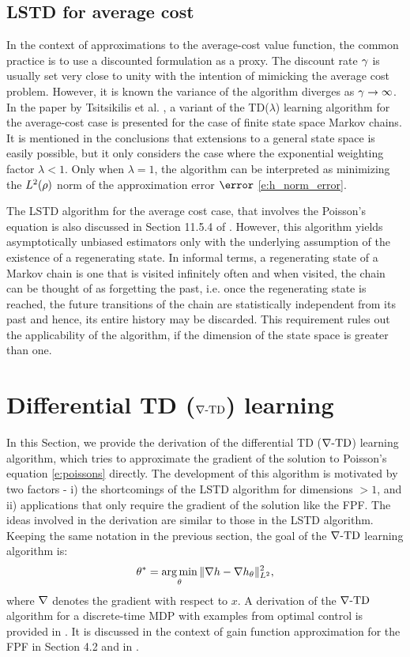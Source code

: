 \subsection{LSTD for average cost}
\label{s:lstd_avg_cost}
In the context of approximations to the average-cost value function, the common practice is to use a discounted formulation as a proxy. The discount rate $\gamma$ is usually set very close to unity with the intention of mimicking the average cost problem. However, it is known the variance of the algorithm diverges as $\gamma \to \infty$.  In the paper by Tsitsikilis et al. \cite{tsivan99b}, a variant of the TD($\lambda$) learning algorithm for the average-cost case is presented for the case of finite state space Markov chains. It is mentioned in the conclusions that extensions to a general state space is easily possible, but it only considers the case where the exponential weighting factor $\lambda <1$. Only when $\lambda =1$, the algorithm can be interpreted as minimizing the $L^2(\rho)$ norm of the approximation error $\error$ \eqref{e:h_norm_error}. 

The LSTD algorithm for the average cost case, that involves the Poisson's equation is also discussed in Section 11.5.4 of \cite{ctcn}. However, this algorithm yields asymptotically unbiased estimators only with the underlying assumption of the existence of a regenerating state. In informal terms, a regenerating state of a Markov chain is one that is visited infinitely often and when visited, the chain can be thought of as forgetting the past, i.e. once the regenerating state is reached, the future transitions of the chain are statistically independent from its past and hence, its entire history may be discarded. This requirement rules out the applicability of the algorithm, if the dimension of the state space is greater than one. 


\section{Differential TD ($\nabla\text{-TD}$) learning}
\label{s:diff_td_learning}
In this Section, we provide the derivation of the differential TD ($\nabla\text{-TD}$) learning algorithm, which tries to approximate the gradient of the solution to Poisson's equation \eqref{e:poissons} directly. The development of this algorithm is motivated by two factors - i) the shortcomings of the LSTD algorithm for dimensions $>1$, and ii) applications that only require the gradient of the solution like the FPF. The ideas involved in the derivation are similar to those in the LSTD algorithm. Keeping the same notation in the previous section, the goal of the $\nabla\text{-TD}$ learning algorithm is:
\begin{equation}
\param^* = \argmin_\param \| \grad h -\grad h_\param\|^2_{L^2},
\label{e:gradTD_norm_error}
\end{equation}
where $\nabla$ denotes the gradient with respect to $x$. A derivation of the $\nabla\text{-TD}$ algorithm for a discrete-time MDP with examples from optimal control is provided in \cite{devmey16arXiv}. It is discussed in the context of gain function approximation for the FPF in Section 4.2 and in \cite{raddevmey16}. 

